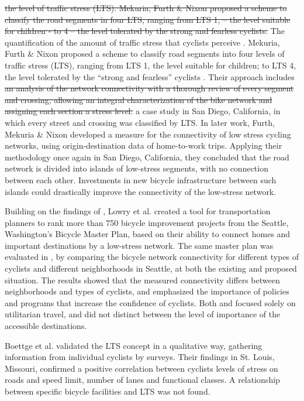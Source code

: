 \documentclass[information,article,submit,moreauthors,Latex,dvi2pdf,10pt,a4paper]{Definitions/mdpi}
\begin{document}
\begin{mycolorbox}[colback=yellow]
\sout{the level of traffic stress (LTS). Mekuria, Furth \& Nixon proposed a scheme to classify the road segments in four LTS, ranging from LTS 1, – the level suitable for children - to 4 – the level tolerated by the strong and fearless cyclists.} 
The quantification of the amount of traffic stress that cyclists perceive \cite{Sorton1994,Geller2006}. Mekuria, Furth \& Nixon \cite{Mekuria2012b} proposed a scheme to classify road segments into four levels of traffic stress (LTS), ranging from LTS 1, the level suitable for children; to LTS 4, the level tolerated by the “strong and fearless” cyclists \cite{Dill2016}. Their approach includes \sout{an analysis of the network connectivity with a thorough review of every segment and crossing, allowing an integral characterization of the bike network and assigning each section a stress level.} a case study in San Diego, California, in which every street and crossing was classified by LTS. In later work, Furth, Mekuria \& Nixon \cite{Furth2016} developed a measure for the connectivity of low stress cycling networks, using origin-destination data of home-to-work trips. Applying their methodology once again in San Diego, California, they concluded that the road network is divided into islands of low-stress segments, with no connection between each other. Investments in new bicycle infrastructure between such islands could drastically improve the connectivity of the low-stress network.

Building on the findings of \cite{Mekuria2012b}, Lowry et al. \cite{Lowry2016} created a tool for transportation planners to rank more than 750 bicycle improvement projects from the Seattle, Washington’s Bicycle Master Plan, based on their ability to connect homes and important destinations by a low-stress network. The same master plan was evaluated in \cite{Lowry2017}, by comparing the bicycle network connectivity for different types of cyclists and different neighborhoods in Seattle, at both the existing and proposed situation. The results showed that the measured connectivity differs between neighborhoods and types of cyclists, and emphasized the importance of policies and programs that increase the confidence of cyclists. Both \cite{Lowry2016} and \cite{Lowry2017} focused solely on utilitarian travel, and did not distinct between the level of importance of the accessible destinations. 

Boettge et al. \cite{Boettge2017} validated the LTS concept in a qualitative way, gathering information from individual cyclists by surveys. Their findings in St. Louis, Missouri, confirmed a positive correlation between cyclists levels of stress on roads and speed limit, number of lanes and functional classes. A relationship between specific bicycle facilities and LTS was not found. 
\end{mycolorbox}
\end{document}
